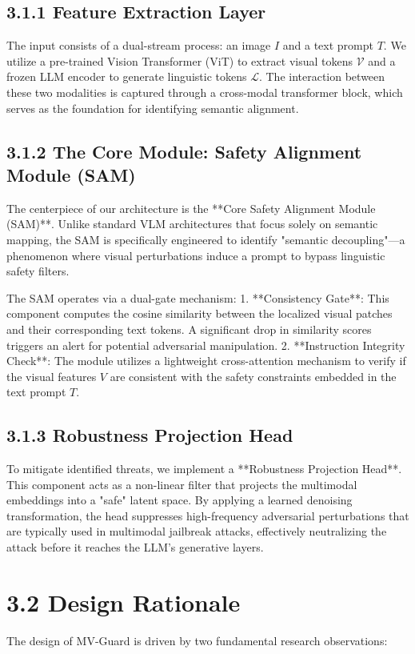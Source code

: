 \documentclass[11pt,a4paper]{article}
\begin{document}
\subsection{3.1.1 Feature Extraction Layer}
The input consists of a dual-stream process: an image $I$ and a text prompt $T$. We utilize a pre-trained Vision Transformer (ViT) to extract visual tokens $\mathcal{V}$ and a frozen LLM encoder to generate linguistic tokens $\mathcal{L}$. The interaction between these two modalities is captured through a cross-modal transformer block, which serves as the foundation for identifying semantic alignment.

\subsection{3.1.2 The Core Module: Safety Alignment Module (SAM)}
The centerpiece of our architecture is the **Core Safety Alignment Module (SAM)**. Unlike standard VLM architectures that focus solely on semantic mapping, the SAM is specifically engineered to identify "semantic decoupling"—a phenomenon where visual perturbations induce a prompt to bypass linguistic safety filters.

The SAM operates via a dual-gate mechanism:
1.  **Consistency Gate**: This component computes the cosine similarity between the localized visual patches and their corresponding text tokens. A significant drop in similarity scores triggers an alert for potential adversarial manipulation.
2.  **Instruction Integrity Check**: The module utilizes a lightweight cross-attention mechanism to verify if the visual features $V$ are consistent with the safety constraints embedded in the text prompt $T$.

\subsection{3.1.3 Robustness Projection Head}
To mitigate identified threats, we implement a **Robustness Projection Head**. This component acts as a non-linear filter that projects the multimodal embeddings into a "safe" latent space. By applying a learned denoising transformation, the head suppresses high-frequency adversarial perturbations that are typically used in multimodal jailbreak attacks, effectively neutralizing the attack before it reaches the LLM's generative layers.

\section{3.2 Design Rationale}
The design of MV-Guard is driven by two fundamental research observations:
\end{document}
